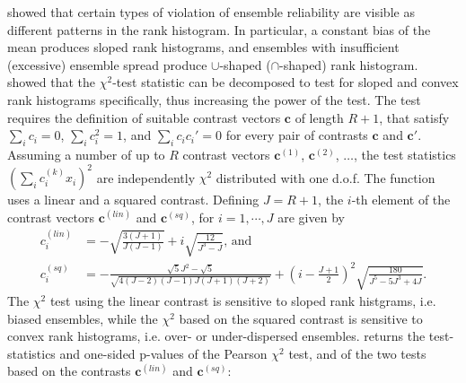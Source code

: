 \documentclass[article]{jss}
\begin{document}
\citet{hamill2001interpretation} showed that certain types of violation of ensemble reliability are visible as different patterns in the rank histogram.
In particular, a constant bias of the mean produces sloped rank histograms, and ensembles with insufficient (excessive) ensemble spread produce $\cup$-shaped ($\cap$-shaped) rank histogram.
\citet{jolliffe2008evaluating} showed that the $\chi^2$-test statistic can be decomposed to test for sloped and convex rank histograms specifically, thus increasing the power of the test.
The test requires the definition of suitable contrast vectors $\mathbf{c}$ of length $R+1$, that satisfy $\sum_i c_i = 0$, $\sum_i c_i^2 = 1$, and $\sum_i c_i c_i' = 0$ for every pair of contrasts $\mathbf{c}$ and $\mathbf{c}'$.
Assuming a number of up to $R$ contrast vectors $\mathbf{c}^{(1)}$, $\mathbf{c}^{(2)}$, $\dots$, the test statistics $(\sum_i c^{(k)}_i x_i)^2$ are independently $\chi^2$ distributed with one d.o.f. 
The function  uses a linear and a squared contrast. Defining $J=R+1$, the $i$-th element of the contrast vectors $\mathbf{c}^{(lin)}$ and $\mathbf{c}^{(sq)}$, for $i=1,\cdots,J$ are given by
%
\begin{align}
c^{(lin)}_i & = -\sqrt{\frac{3(J+1)}{J (J-1)}} + i \sqrt{\frac{12}{J^3 - J}}\text{, and}\\
c^{(sq)}_i & =  - \frac{\sqrt{5}  J^2 - \sqrt{5}}{\sqrt{4(J - 2)  (J-1) J (J+1) (J+2)}}+ \left(i - \frac{J+1}{2}\right)^2   \sqrt{\frac{180}{ J^5 - 5 J^3 + 4 J}}.
\end{align}
%
The $\chi^2$ test using the linear contrast is sensitive to sloped rank histgrams, i.e. biased ensembles, while the $\chi^2$ based on the squared contrast is sensitive to convex rank histograms, i.e. over- or under-dispersed ensembles.
 returns the test-statistics and one-sided p-values of the Pearson $\chi^2$ test, and of the two tests based on the contrasts $\mathbf{c}^{(lin)}$ and $\mathbf{c}^{(sq)}$:
\end{document}
